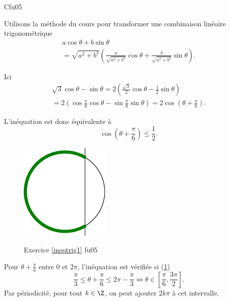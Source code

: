 \begin{tiny}Cfu05\end{tiny} \label{ineqtrig1} Utilisons la méthode du cours pour transformer une combinaison linéaire trigonométrique
\begin{multline*}
  a \cos \theta + b \sin \theta \\
  = \sqrt{a^2 + b^2}\left( \frac{a}{\sqrt{a^2 + b^2}}\cos \theta + \frac{b}{\sqrt{a^2 + b^2}}\sin \theta\right).
\end{multline*}

Ici
\begin{multline*}
  \sqrt{3}\cos \theta - \sin \theta = 2 \left( \frac{\sqrt{3}}{2} \cos \theta - \frac{1}{2}\sin \theta\right)\\
  = 2 \left( \cos \frac{\pi}{6} \cos \theta -\sin \frac{\pi}{6} \sin \theta\right)
  = 2 \cos(\theta + \frac{\pi}{6}).
\end{multline*}

L'inéquation est donc équivalente à 
\[
  \cos(\theta + \frac{\pi}{6}) \leq \frac{1}{2}.
\]
\begin{figure}[h!]
  \centering
  \includegraphics{Cfu05_1.pdf}
  \label{fig:Cfu05_1}
  \caption{Exercice \ref{ineqtrig1} fu05}
\end{figure}
Pour $\theta + \frac{\pi}{6}$ entre $0$ et $2\pi$, l'inéquation est vérifiée si (\ref{fig:Cfu05_1})
\[
  \frac{\pi}{3} \leq \theta + \frac{\pi}{6} \leq 2\pi - \frac{\pi}{3}
  \Leftrightarrow
 \theta \in \left[\frac{\pi}{6} , \frac{3\pi}{2} \right].
\]
Par périodicité, pour tout $k\in \Z$, on peut ajouter $2k\pi$ à cet intervalle. 
